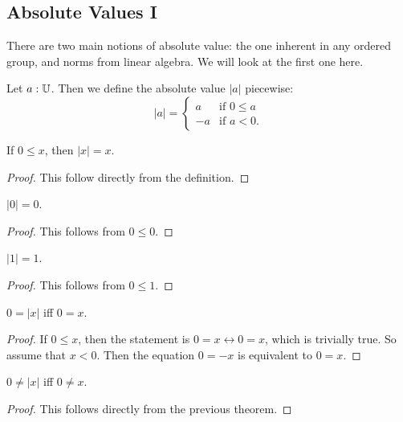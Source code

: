 \documentclass[../../math.tex]{subfiles}
\begin{document}
\subsection{Absolute Values I}

There are two main notions of absolute value: the one inherent in any ordered
group, and norms from linear algebra.  We will look at the first one here.

\begin{definition}
    Let $a : \mathbb{U}$.  Then we define the absolute value $|a|$ piecewise:
    \[
        |a| = \begin{cases}
            a & \text{if $0 \leq a$} \\
            -a & \text{if $a < 0$.}
        \end{cases}
    \]
\end{definition}

\begin{theorem} \label{abs_pos_eq}
    If $0 \leq x$, then $|x| = x$.
\end{theorem}
\begin{proof}
    This follow directly from the definition.
\end{proof}

\begin{theorem}
    $|0| = 0$.
\end{theorem}
\begin{proof}
    This follows from $0 \leq 0$.
\end{proof}

\begin{theorem}
    $|1| = 1$.
\end{theorem}
\begin{proof}
    This follows from $0 \leq 1$.
\end{proof}

\begin{theorem}
    $0 = |x|$ iff $0 = x$.
\end{theorem}
\begin{proof}
    If $0 \leq x$, then the statement is $0 = x \leftrightarrow 0 = x$, which is
    trivially true.  So assume that $x < 0$.  Then the equation $0 = -x$ is
    equivalent to $0 = x$.
\end{proof}

\begin{theorem}
    $0 \neq |x|$ iff $0 \neq x$.
\end{theorem}
\begin{proof}
    This follows directly from the previous theorem.
\end{proof}
\end{document}

